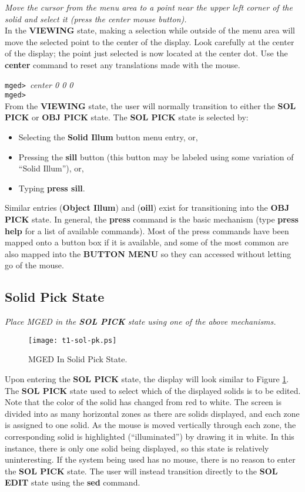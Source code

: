 \noindent
{\em Move the cursor from the menu area to a point near the
upper left corner of the solid and select it (press the center mouse
button).}\\

In the {\bf VIEWING} state, making a selection while outside of the menu
area will move the selected point to the center of the display.  Look
carefully at the center of the display; the point just selected is now
located at the center dot. Use the {\bf center} command to reset any
translations made with the mouse.

\noindent
{\tt mged> }{\em center 0 0 0}\\
{\tt mged> }\\

From the {\bf VIEWING} state, the user will normally transition to either the
{\bf SOL PICK} or {\bf OBJ PICK} state.
The {\bf SOL PICK} state is selected by:
\begin{itemize}
\item Selecting the {\bf Solid Illum} button menu entry, or,
\item Pressing the {\bf sill} button (this button may be labeled
using some variation of ``Solid Illum''), or,
\item Typing {\bf press sill}.
\end{itemize}
Similar entries ({\bf Object Illum}) and ({\bf oill}) exist for transitioning
into the {\bf OBJ PICK} state.
In general, the {\bf press} command is the basic mechanism (type
{\bf press help} for a list of available commands).  Most of the press
commands have been mapped onto a button box if it is available,
 and some of the
most common are also mapped into the {\bf BUTTON MENU} so they can
accessed without letting go of the mouse.

\subsection{Solid Pick State}

\noindent
{\em Place MGED in the {\bf SOL PICK} state using one of the
above mechanisms.}\\

\begin{figure}
\centering \texttt{[image: t1-sol-pk.ps]}
\caption{MGED In Solid Pick State.}
\label{t1-sol-pk}
\end{figure}

Upon entering the {\bf SOL PICK} state, the display will look similar to
Figure \ref{t1-sol-pk}.  The {\bf SOL PICK} state used to select which
of the displayed solids is to be edited.  Note that the color of the
solid has changed from red to white.  The screen is divided into as many
horizontal zones as there are solids displayed, and each zone is
assigned to one solid.  As the mouse is moved vertically through each
zone, the corresponding solid is highlighted (``illuminated'') by
drawing it in white.   In this instance, there is only one solid being
displayed, so this state is relatively uninteresting.
If the system being used has no mouse, there is no reason to enter the
{\bf SOL PICK} state.  The user will instead transition directly to
the {\bf SOL EDIT} state using the {\bf sed} command.

